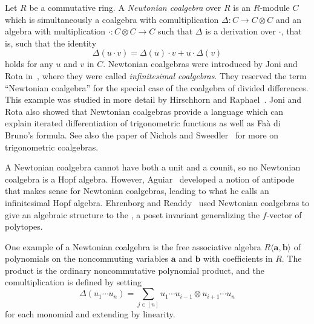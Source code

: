 \documentclass[12pt]{article}
\begin{document}
Let $R$ be a commutative ring.  A \emph{Newtonian coalgebra} over $R$ is an $R$-module $C$ which is simultaneously a coalgebra with comultiplication $\Delta\colon C\to C\otimes C$ and an algebra with multiplication $\cdot\colon C\otimes C\to C$ such that $\Delta$ is a derivation over $\cdot$, that is, such that the identity
\[
\Delta(u\cdot v) = \Delta(u)\cdot v + u\cdot\Delta(v)
\]
holds for any $u$ and $v$ in $C$.  Newtonian coalgebras were introduced by Joni and Rota in~\cite{JoRo}, where they were called \emph{infinitesimal coalgebras}.     They reserved the term ``Newtonian coalgebra'' for the special case of the coalgebra of divided differences.  This example was studied in more detail by Hirschhorn and Raphael~\cite{HiRa}.  Joni and Rota also showed that Newtonian coalgebras provide a language which can explain iterated differentiation of trigonometric functions as well as Fa\`{a} di Bruno's formula.  See also the paper of Nichols and Sweedler~\cite{NiSw} for more on trigonometric coalgebras.

A Newtonian coalgebra cannot have both a unit and a counit, so no Newtonian coalgebra is a Hopf algebra.  However, Aguiar~\cite{Ag} developed a notion of antipode that makes sense for Newtonian coalgebras, leading to what he calls an infinitesimal Hopf algebra.  Ehrenborg and Readdy~\cite{EhRe_coproducts} used Newtonian coalgebras to give an algebraic structure to the , a poset invariant generalizing the $f$-vector of polytopes.

One example of a Newtonian coalgebra is the free associative algebra $R\langle\mathbf{a},\mathbf{b}\rangle$ of polynomials on the noncommuting variables $\mathbf{a}$ and $\mathbf{b}$ with coefficients in $R$.  The product is the ordinary noncommutative polynomial product, and the comultiplication is defined by setting
\[
\Delta(u_1\cdots u_n) = \sum_{j\in[n]} u_1\cdots u_{i-1}\otimes u_{i+1}\cdots u_n
\]
for each monomial and extending by linearity.
\end{document}
